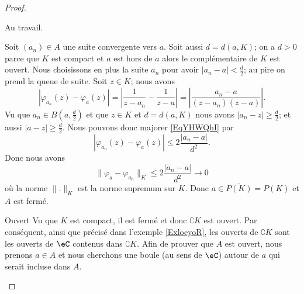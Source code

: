 \begin{proof}
\begin{subproof}
        Au travail.

        Soit \( (a_n)\in A\) une suite convergente vers \( a\). Soit aussi \( d=d(a,K)\); on a \( d>0\) parce que \( K\) est compact et \( a\) est hors de \( a\) alors le complémentaire de \( K\) est ouvert. Nous choisissons en plus la suite \( a_n\) pour avoir \( | a_n-a |<\frac{ d }{2}\); au pire on prend la queue de suite. Soit \( z\in K\); nous avons
        \begin{equation}    \label{EqYHWQhI}
            | \varphi_{a_n}(z)-\varphi_a(z) |=\left| \frac{1}{ z-a_n }-\frac{1}{ z-a } \right| =  \left| \frac{ a_n-a }{ (z-a_n)(z-a) } \right|.
        \end{equation}
        Vu que \( a_n\in B(a,\frac{ d }{2})\) et que \( z\in K\) et \( d=d(a,K)\) nous avons \( | a_n-z |\geq \frac{ d }{2}\); et aussi \( | a-z |\geq \frac{ d }{2}\). Nous pouvons donc majorer \eqref{EqYHWQhI} par
        \begin{equation}
            | \varphi_{a_n}(z)-\varphi_a(z) |\leq 2\frac{ | a_n-a | }{ d^2 }.
        \end{equation}
        Donc nous avons
        \begin{equation}
            \| \varphi_a-\varphi_{a_n} \|_K\leq 2\frac{ | a_n-a | }{ d^2 }\to 0
        \end{equation}
        où la norme \( \| . \|_K\) est la norme supremum sur \( K\). Donc \( a\in \overline{ P(K) }=P(K)\) et \( A\) est fermé.

    \item[Ouvert] Vu que \( K\) est compact, il est fermé et donc \( \complement K\) est ouvert. Par conséquent, ainsi que précisé dans l'exemple \ref{ExloeyoR}, les ouverts de \( \complement K\) sont les ouverts de \( \eC\) contenus dans \( \complement K\). Afin de prouver que \( A\) est ouvert, nous prenons  \( a\in A\) et nous cherchons une boule (au sens de \( \eC\)) autour de \( a\) qui serait incluse dans \( A\).


\end{subproof}
\end{proof}

